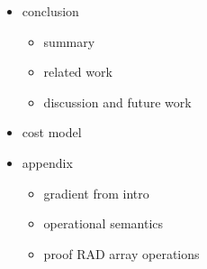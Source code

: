 \begin{itemize}
\begin{itemize}
    \end{itemize}
    \item conclusion
    \begin{itemize}
        \item summary
        \item related work
        \item discussion and future work
    \end{itemize}
    \item cost model
    \item appendix
    \begin{itemize}
        \item gradient from intro
        \item operational semantics
        \item proof RAD array operations
    \end{itemize}
\end{itemize}

\pagebreak
